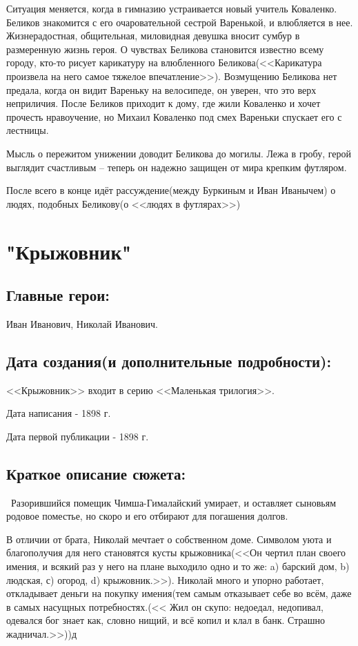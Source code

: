 \documentclass[a4paper,12pt]{article}
\begin{document}
	Ситуация меняется, когда в гимназию устраивается новый учитель Коваленко. Беликов знакомится с его очаровательной сестрой Варенькой, и влюбляется в нее. Жизнерадостная, общительная, миловидная девушка вносит сумбур в размеренную жизнь героя. О чувствах Беликова становится известно всему городу, кто-то рисует карикатуру на влюбленного Беликова(<<Карикатура произвела на него самое тяжелое впечатление>>). Возмущению Беликова нет предала, когда он видит Вареньку на велосипеде, он уверен, что это верх неприличия. После Беликов приходит к дому, где жили Коваленко и хочет прочесть нравоучение, но Михаил Коваленко под смех Вареньки спускает его с лестницы.
	
	Мысль о пережитом унижении доводит Беликова до могилы. Лежа в гробу, герой выглядит счастливым – теперь он надежно защищен от мира крепким футляром.
	
	После всего в конце идёт рассуждение(между Буркиным и Иван Иванычем) о людях, подобных Беликову(о <<людях в футлярах>>)
	
	\section{"Крыжовник"}
	\subsection{Главные герои: }
	Иван Иванович, Николай Иванович.
	\subsection{Дата создания(и дополнительные подробности): }
	<<Крыжовник>> входит в серию <<Маленькая трилогия>>.
	
	\noindent
	Дата написания - 1898 г.
	
	\noindent
	Дата первой публикации - 1898 г.
	
	\subsection{Краткое описание сюжета: }
	\quad \, Разорившийся помещик Чимша-Гималайский умирает, и оставляет сыновьям родовое поместье, но скоро и его отбирают для погашения долгов.
	
	В отличии от брата, Николай мечтает о собственном доме. Символом уюта и благополучия для него становятся кусты крыжовника(<<Он чертил план своего имения, и всякий раз у него на плане выходило одно и то же: a) барский дом, b) людская, с) огород, d) крыжовник.>>). Николай много и упорно работает, откладывает деньги на покупку имения(тем самым отказывает себе во всём, даже в самых насущных потребностях.(<< Жил он скупо: недоедал, недопивал, одевался бог знает как, словно нищий, и всё копил и клал в банк. Страшно жадничал.>>))д
	
\end{document}
